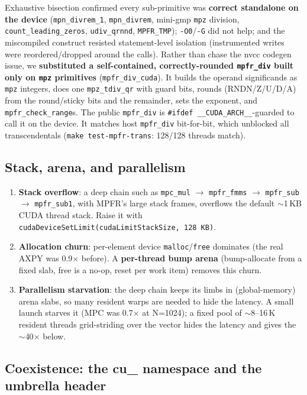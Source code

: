 \documentclass[uplatex,dvipdfmx,a4paper,11pt]{jsarticle}
\newcommand{\code}[1]{\texttt{#1}}
\begin{document}
Exhaustive bisection confirmed every sub-primitive was \textbf{correct standalone
on the device} (\code{mpn\_divrem\_1}, \code{mpn\_divrem}, mini-gmp \code{mpz}
division, \code{count\_leading\_zeros}, \code{udiv\_qrnnd}, \code{MPFR\_TMP});
\code{-O0}/\code{-G} did not help; and the miscompiled construct resisted
statement-level isolation (instrumented writes were reordered/dropped around the
calls). Rather than chase the nvcc codegen issue, we \textbf{substituted a
self-contained, correctly-rounded \code{mpfr\_div} built only on \code{mpz}
primitives} (\code{mpfr\_div\_cuda}). It builds the operand significands as
\code{mpz} integers, does one \code{mpz\_tdiv\_qr} with guard bits, rounds
(RNDN/Z/U/D/A) from the round/sticky bits and the remainder, sets the exponent,
and \code{mpfr\_check\_range}s. The public \code{mpfr\_div} is
\code{\#ifdef \_\_CUDA\_ARCH\_\_}-guarded to call it on the device. It matches host
\code{mpfr\_div} bit-for-bit, which unblocked all transcendentals
(\code{make test-mpfr-trans}: 128/128 threads match).

\subsection{Stack, arena, and parallelism}

\begin{enumerate}
\item \textbf{Stack overflow}: a deep chain such as \code{mpc\_mul} $\to$
      \code{mpfr\_fmms} $\to$ \code{mpfr\_sub} $\to$ \code{mpfr\_sub1}, with MPFR's
      large stack frames, overflows the default $\sim$1\,KB CUDA thread stack.
      Raise it with \code{cudaDeviceSetLimit(cudaLimitStackSize, 128\,KB)}.
\item \textbf{Allocation churn}: per-element device \code{malloc}/\code{free}
      dominates (the real AXPY was 0.9$\times$ before). A \textbf{per-thread bump
      arena} (bump-allocate from a fixed slab, free is a no-op, reset per work
      item) removes this churn.
\item \textbf{Parallelism starvation}: the deep chain keeps its limbs in
      (global-memory) arena slabs, so many resident warps are needed to hide the
      latency. A small launch starves it (MPC was 0.7$\times$ at N=1024); a fixed
      pool of $\sim$8--16\,K resident threads grid-striding over the vector hides
      the latency and gives the $\sim$40$\times$ below.
\end{enumerate}

\subsection{Coexistence: the cu\_ namespace and the umbrella header}
\end{document}
